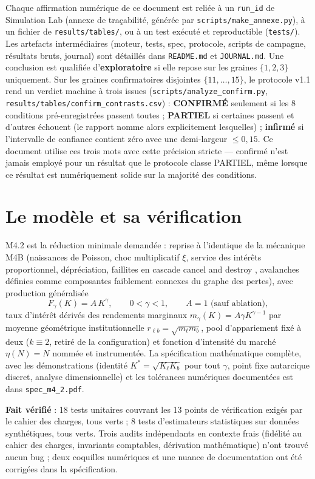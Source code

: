 \documentclass[11pt,a4paper]{article}
\newcommand{\code}[1]{\texttt{#1}}
\begin{document}
Chaque affirmation numérique de ce document est reliée à un
\code{run\_id} de Simulation Lab (annexe de traçabilité, générée par
\code{scripts/make\_annexe.py}), à un fichier de
\code{results/tables/}, ou à un test exécuté et reproductible
(\code{tests/}). Les artefacts intermédiaires (moteur, tests, spec,
protocole, scripts de campagne, résultats bruts, journal) sont détaillés
dans \code{README.md} et \code{JOURNAL.md}. Une conclusion est qualifiée
d'\textbf{exploratoire} si elle repose sur les graines $\{1,2,3\}$
uniquement. Sur les graines confirmatoires disjointes $\{11,\dots,15\}$,
le protocole v1.1 rend un verdict machine à trois issues
(\code{scripts/analyze\_confirm.py},
\code{results/tables/confirm\_contrasts.csv}) : \textbf{CONFIRMÉ}
seulement si les 8 conditions pré-enregistrées passent toutes ;
\textbf{PARTIEL} si certaines passent et d'autres échouent (le rapport
nomme alors explicitement lesquelles) ; \textbf{infirmé} si l'intervalle
de confiance contient zéro avec une demi-largeur $\le0{,}15$. Ce document
utilise ces trois mots avec cette précision stricte --- \og confirmé \fg{}
n'est jamais employé pour un résultat que le protocole classe PARTIEL,
même lorsque ce résultat est numériquement solide sur la majorité des
conditions.

\section{Le modèle et sa vérification}

M4.2 est la réduction minimale demandée : reprise à l'identique de la
mécanique M4B (naissances de Poisson, choc multiplicatif $\xi$, service
des intérêts proportionnel, dépréciation, faillites en cascade
\og cancel and destroy \fg, avalanches définies comme composantes
faiblement connexes du graphe des pertes), avec production généralisée
\[
F_\gamma(K)=A\,K^\gamma,\qquad 0<\gamma<1,\qquad A=1\text{ (sauf ablation)},
\]
taux d'intérêt dérivés des rendements marginaux $m_\gamma(K)=A\gamma
K^{\gamma-1}$ par moyenne géométrique institutionnelle
$r_{\ell b}=\sqrt{m_\ell m_b}$, pool d'appariement fixé à deux
($k\equiv2$, retiré de la configuration) et fonction d'intensité du
marché $\eta(N)=N$ nommée et instrumentée. La spécification mathématique
complète, avec les démonstrations (identité $K^*=\sqrt{K_\ell K_b}$ pour
tout $\gamma$, point fixe autarcique discret, analyse dimensionnelle) et
les tolérances numériques documentées est dans \code{spec\_m4\_2.pdf}.

\textbf{Fait vérifié} : 18 tests unitaires couvrant les 13 points de
vérification exigés par le cahier des charges, tous verts ; 8 tests
d'estimateurs statistiques sur données synthétiques, tous verts. Trois
audits indépendants en contexte frais (fidélité au cahier des charges,
invariants comptables, dérivation mathématique) n'ont trouvé aucun bug ;
deux coquilles numériques et une nuance de documentation ont été
corrigées dans la spécification.
\end{document}
